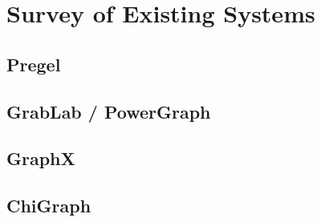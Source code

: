 \section{Survey of Existing Systems}
\subsection{Pregel}
\subsection{GrabLab / PowerGraph}
\subsection{GraphX}
\subsection{ChiGraph}
